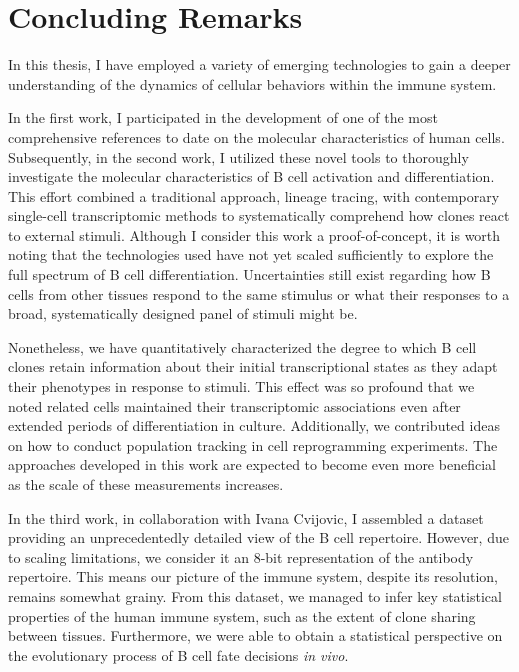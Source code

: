 \chapter{Concluding Remarks}
In this thesis, I have employed a variety of emerging technologies to gain a deeper understanding of the dynamics of cellular behaviors within the immune system.

In the first work, I participated in the development of one of the most comprehensive references to date on the molecular characteristics of human cells. Subsequently, in the second work, I utilized these novel tools to thoroughly investigate the molecular characteristics of B cell activation and differentiation. This effort combined a traditional approach, lineage tracing, with contemporary single-cell transcriptomic methods to systematically comprehend how clones react to external stimuli. Although I consider this work a proof-of-concept, it is worth noting that the technologies used have not yet scaled sufficiently to explore the full spectrum of B cell differentiation. Uncertainties still exist regarding how B cells from other tissues respond to the same stimulus or what their responses to a broad, systematically designed panel of stimuli might be.

Nonetheless, we have quantitatively characterized the degree to which B cell clones retain information about their initial transcriptional states as they adapt their phenotypes in response to stimuli. This effect was so profound that we noted related cells maintained their transcriptomic associations even after extended periods of differentiation in culture. Additionally, we contributed ideas on how to conduct population tracking in cell reprogramming experiments. The approaches developed in this work are expected to become even more beneficial as the scale of these measurements increases.

In the third work, in collaboration with Ivana Cvijovic, I assembled a dataset providing an unprecedentedly detailed view of the B cell repertoire. However, due to scaling limitations, we consider it an 8-bit representation of the antibody repertoire. This means our picture of the immune system, despite its resolution, remains somewhat grainy. From this dataset, we managed to infer key statistical properties of the human immune system, such as the extent of clone sharing between tissues. Furthermore, we were able to obtain a statistical perspective on the evolutionary process of B cell fate decisions \textit{in vivo}.


